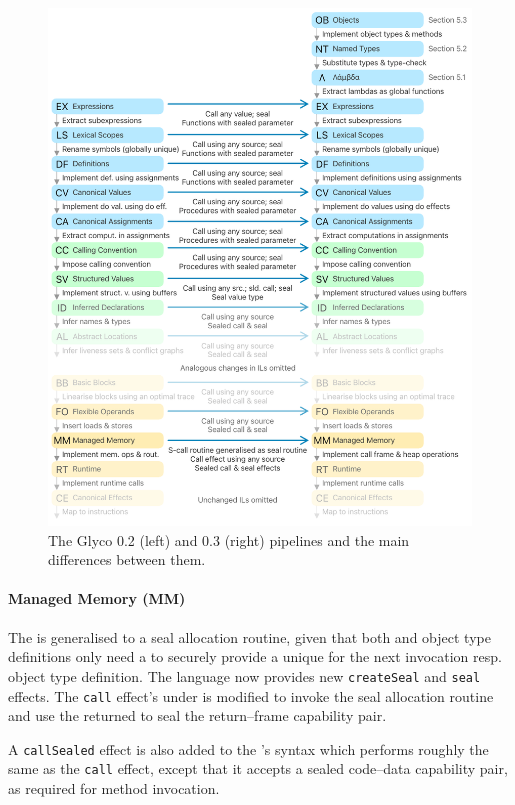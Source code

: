 \documentclass[main.tex]{subfiles}
\begin{document}
\begin{figure}
	\centering
	\includegraphics{Images/Pipeline v0.3.pdf}
	\caption{The Glyco 0.2 (left) and 0.3 (right) pipelines and the main differences between them.}
	\label{fig:pipeline03}
\end{figure}

\paragraph{Managed Memory (MM)} The   is generalised to a seal allocation routine, given that both  and object type definitions only need a  to securely provide a unique  for the next invocation resp. object type definition. The language now provides new \texttt{createSeal} and \texttt{seal} effects. The \texttt{call} effect's  under  is modified to invoke the seal allocation routine and use the returned  to seal the return–frame capability pair.

A \texttt{callSealed} effect is also added to the 's syntax which performs roughly the same as the \texttt{call} effect, except that it accepts a sealed code–data capability pair, as required for method invocation.
\end{document}
